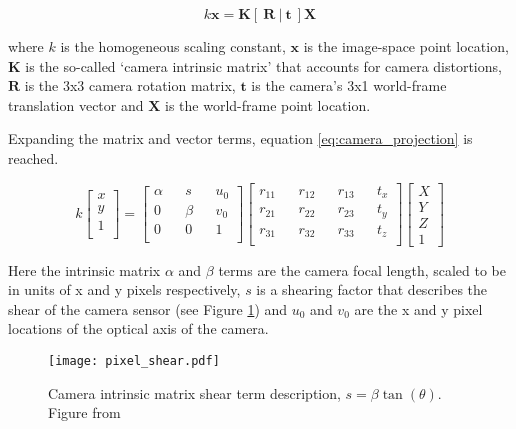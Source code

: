 \begin{equation}
\label{eq:camera_projection_unexpanded}
k \boldsymbol{x} = \boldsymbol{K} \left[~\boldsymbol{R}~|~\boldsymbol{t}~\right] \boldsymbol{X}
\end{equation}

\noindent
where $k$ is the homogeneous scaling constant, $\boldsymbol{x}$ is the image-space point location, $\boldsymbol{K}$ is the so-called \enquote*{camera intrinsic matrix} that accounts for camera distortions, $\boldsymbol{R}$ is the 3x3 camera rotation matrix,  $\boldsymbol{t}$ is the camera's 3x1 world-frame translation vector and $\boldsymbol{X}$ is the world-frame point location.

Expanding the matrix and vector terms, equation \ref{eq:camera_projection} is reached.

\begin{equation}
\label{eq:camera_projection}
k
\begin{bmatrix}
x \\
y \\
1 \\
\end{bmatrix}
=
\begin{bmatrix}
\alpha && s && u_0 \\
0 && \beta && v_0 \\
0 && 0 && 1 \\
\end{bmatrix}
\begin{bmatrix}
r_{11} && r_{12} && r_{13} && t_x \\
r_{21} && r_{22} && r_{23} && t_y \\
r_{31} && r_{32} && r_{33} && t_z \\
\end{bmatrix}
\begin{bmatrix}
X \\
Y \\
Z \\
1
\end{bmatrix}
\end{equation}

Here the intrinsic matrix $\alpha$ and $\beta$ terms are the camera focal length, scaled to be in units of x and y pixels respectively, $s$ is a shearing factor that describes the shear of the camera sensor (see Figure \ref{fig:intrinsic_shear}) and $u_0$ and $v_0$ are the x and y pixel locations of the optical axis of the camera.

\begin{figure}[h]
\centering
\texttt{[image: pixel\_shear.pdf]}
\caption[Camera intrinsic matrix shear term]{Camera intrinsic matrix shear term description, $s = \beta\tan(\theta)$. Figure from \cite{pollefeys2002visual}}
\label{fig:intrinsic_shear}
\end{figure}

